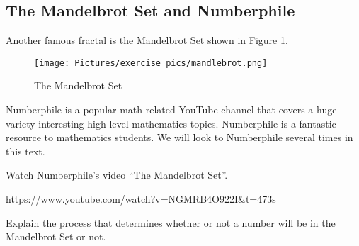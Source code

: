 \blanks
\blanks

\subsection{The Mandelbrot Set and Numberphile}

Another famous fractal is the Mandelbrot Set shown in Figure \ref{fig:mandelbrot}.

\begin{figure}[h]
    \centering
    \texttt{[image: Pictures/exercise pics/mandlebrot.png]}
    \caption{The Mandelbrot Set}
    \label{fig:mandelbrot}
\end{figure}

\noindent Numberphile is a popular math-related YouTube channel that covers a huge variety interesting high-level mathematics topics. Numberphile is a fantastic resource to mathematics students. We will look to Numberphile several times in this text.

\begin{exercise}
Watch Numberphile's video “The Mandelbrot Set”. \cite{numberphile_mandelbrot}
\end{exercise}
{\footnotesize https://www.youtube.com/watch?v=NGMRB4O922I\&t=473s } 

\begin{exercise}
Explain the process that determines whether or not a number will be in the Mandelbrot Set or not.
\end{exercise}

\blanks
\blanks



